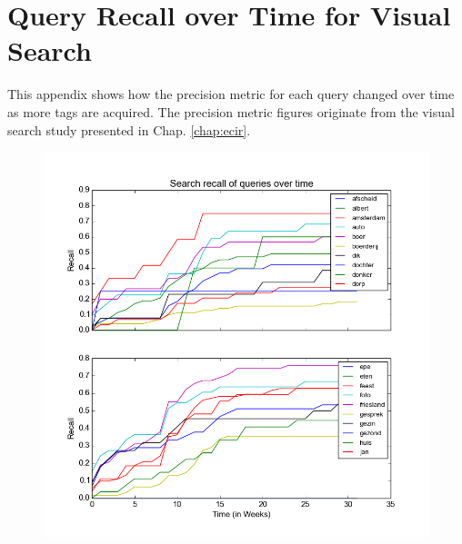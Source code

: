 \chapter{Query Recall over Time for Visual Search}\label{appen:recovertime}
This appendix shows how the precision metric for each query changed over time as more tags are acquired. The precision metric figures originate from the visual search study presented in Chap. \ref{chap:ecir}.

\begin{figure}[H]
\centering
\includegraphics[scale=0.55]{appendixc/recallovertime0}
\end{figure}


